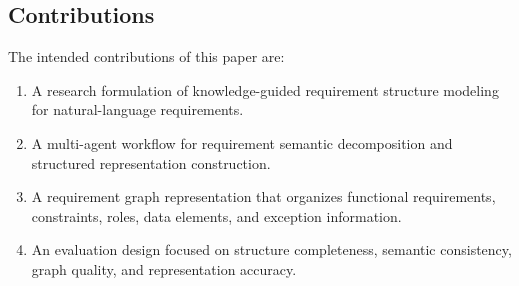 \subsection{Contributions}
\label{sec:intro-contributions}

The intended contributions of this paper are:
\begin{enumerate}[leftmargin=*]
  \item A research formulation of knowledge-guided requirement structure modeling for natural-language requirements.
  \item A multi-agent workflow for requirement semantic decomposition and structured representation construction.
  \item A requirement graph representation that organizes functional requirements, constraints, roles, data elements, and exception information.
  \item An evaluation design focused on structure completeness, semantic consistency, graph quality, and representation accuracy.
\end{enumerate}
